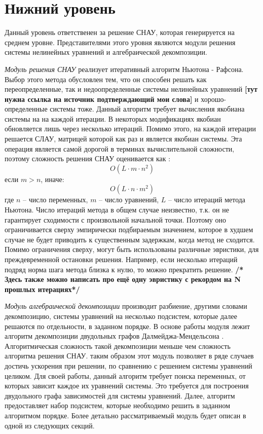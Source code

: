 \section{Нижний уровень} \label{sec:low_level}
Данный уровень ответственен за решение СНАУ, которая генерируется на среднем уровне. Представителями этого уровня являются модули решения системы нелинейных уравнений и алгебраической декомпозиции. 

\textit{Модуль решения СНАУ} реализует итеративный алгоритм Ньютона - Рафсона. Выбор этого метода обусловлен тем, что он способен решать как переопределенные, так и недоопределенные системы нелинейных уравнений \textbf{[тут нужна ссылка на источник подтверждающий мои слова]} и хорошо-определенные системы тоже. Данный алгоритм требует вычисления якобиана системы на на каждой итерации. В некоторых модификациях якобиан обновляется лишь через несколько итераций. Помимо этого, на каждой итерации решается СЛАУ, матрицей которой как раз и является якобиан системы. Эта операция является самой дорогой в терминах вычислительной сложности, поэтому сложность решения СНАУ оценивается как \cite{GoluVanl96}:
\begin{equation*}
    O(L \cdot m \cdot n^2)
\end{equation*}
если $m > n$, иначе:
\begin{equation*}
    O(L \cdot n \cdot m^2)
\end{equation*}
где $n$ -- число переменных, $m$ -- число уравнений, $L$ -- число итераций метода Ньютона. Число итераций метода в общем случае неизвестно, т.к. он не гарантирует сходимости с произвольной начальной точки. Поэтому оно ограничивается сверху эмпирически подбираемым значением, которое в худшем случае не будет приводить к существенным задержкам, когда метод не сходится. Помимо ограничения сверху, могут быть использованы различные эвристики, для преждевременной остановки решения. Например, если несколько итераций подряд норма шага метода близка к нулю, то можно прекратить решение. \textbf{/* Здесь также можно написать про ещё одну эвристику с рекордом на N прошлых итерациях*/}

\textit{Модуль алгебраической декомпозиции} производит разбиение, другими словами декомпозицию, системы уравнений на несколько подсистем, которые далее решаются по отдельности, в заданном порядке. В основе работы модуля лежит алгоритм декомпозиции двудольных графов Далмейджа-Мендельсона \cite{dulmage1958coverings}. Алгоритмическая сложность такой декомпозиции меньше чем сложность алгоритма решения СНАУ. таким образом этот модуль позволяет в ряде случаев достичь ускорения при решении, по сравнению с решением системы уравнений целиком. Для своей работы, данный алгоритм требует поиска переменных, от которых зависит каждое их уравнений системы. Это требуется для построения двудольного графа зависимостей для системы уравнений. Далее, алгоритм предоставляет набор подсистем, которые необходимо решить в заданном алгоритмом порядке. Более детально рассматриваемый модуль будет описан в одной из следующих секций.
